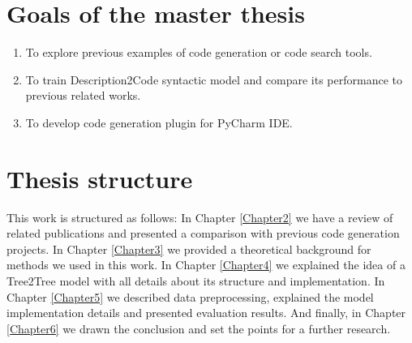 \section{Goals of the master thesis}

\begin{enumerate}
	\item To explore previous examples of code generation or code search tools.
	\item To train Description2Code syntactic model and compare its performance to previous related works.
	\item To develop code generation plugin for PyCharm IDE.
\end{enumerate}

\section{Thesis structure}
This work is structured as follows: In Chapter \ref{Chapter2} we have a review of related publications and presented a comparison with previous code generation projects. In Chapter \ref{Chapter3} we provided a theoretical background for methods we used in this work. In Chapter \ref{Chapter4} we explained the idea of a Tree2Tree model with all details about its structure and implementation. In Chapter \ref{Chapter5} we described data preprocessing, explained the model implementation details and presented evaluation results. And finally, in Chapter \ref{Chapter6} we drawn the conclusion and set the points for a further research.